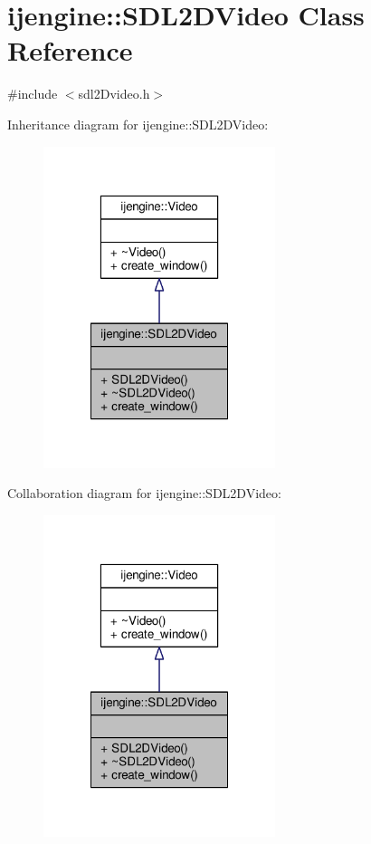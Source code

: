 \hypertarget{classijengine_1_1SDL2DVideo}{\section{ijengine\-:\-:S\-D\-L2\-D\-Video Class Reference}
\label{classijengine_1_1SDL2DVideo}
}


{\ttfamily \#include $<$sdl2\-Dvideo.\-h$>$}



Inheritance diagram for ijengine\-:\-:S\-D\-L2\-D\-Video\-:\nopagebreak
\begin{figure}[H]
\begin{center}
\leavevmode
\includegraphics[width=192pt]{classijengine_1_1SDL2DVideo__inherit__graph}
\end{center}
\end{figure}


Collaboration diagram for ijengine\-:\-:S\-D\-L2\-D\-Video\-:\nopagebreak
\begin{figure}[H]
\begin{center}
\leavevmode
\includegraphics[width=192pt]{classijengine_1_1SDL2DVideo__coll__graph}
\end{center}
\end{figure}
